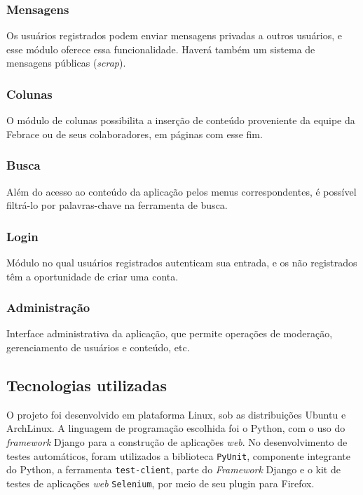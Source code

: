     \subsubsection{Mensagens}
      Os usuários registrados podem enviar mensagens privadas a outros usuários, e esse módulo oferece essa funcionalidade. Haverá também um sistema de mensagens públicas (\textit{scrap}).

    \subsubsection{Colunas}
      O módulo de colunas possibilita a inserção de conteúdo proveniente da equipe da Febrace ou de seus colaboradores, em páginas com esse fim.

    \subsubsection{Busca}
      Além do acesso ao conteúdo da aplicação pelos menus correspondentes, é possível filtrá-lo por palavras-chave na ferramenta de busca.

    \subsubsection{Login}
      Módulo no qual usuários registrados autenticam sua entrada, e os não registrados têm a oportunidade de criar uma conta.

    \subsubsection{Administração}
      Interface administrativa da aplicação, que permite operações de moderação, gerenciamento de usuários e conteúdo, etc.

  \subsection{Tecnologias utilizadas}\label{tecnologias}

O projeto foi desenvolvido em plataforma Linux, sob as distribuições Ubuntu e ArchLinux. A linguagem de programação escolhida foi o Python, com o uso do \textit{framework} Django para a construção de aplicações \textit{web}. No desenvolvimento de testes automáticos, foram utilizados a biblioteca \texttt{PyUnit}, componente integrante do Python, a ferramenta \texttt{test-client}, parte do \textit{Framework} Django e o kit de testes de aplicações \textit{web} \texttt{Selenium}, por meio de seu plugin para Firefox. 

